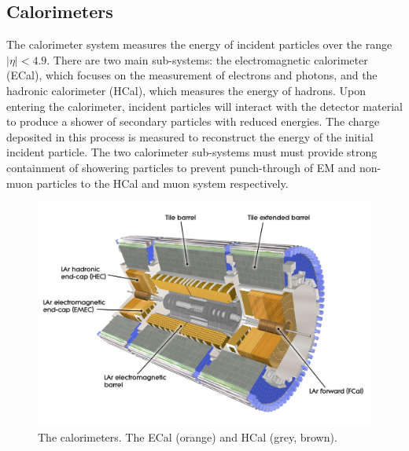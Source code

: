 \subsection{Calorimeters}\label{sec:calorimeter}

The calorimeter system measures the energy of incident particles over the range $|\eta| < 4.9$.
There are two main sub-systems: the electromagnetic calorimeter (ECal), which focuses on the measurement of electrons and photons, and the hadronic calorimeter (HCal), which measures the energy of hadrons.
Upon entering the calorimeter, incident particles will interact with the detector material to produce a shower of secondary particles with reduced energies. 
The charge deposited in this process is measured to reconstruct the energy of the initial incident particle.
The two calorimeter sub-systems must must provide strong containment of showering particles to prevent punch-through of EM and non-muon particles to the HCal and muon system respectively.




%
\begin{figure}[!htpb]
  \centering
  \includegraphics[width=0.8\linewidth]{chapters/2.detector/figs/atlas_calos.jpg}
  \caption{The \ATLAS calorimeters. The ECal (orange) and HCal (grey, brown).}
  \label{fig:atlas_calos}
\end{figure}
%


